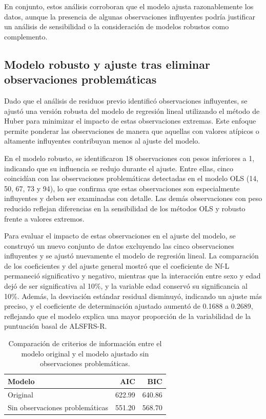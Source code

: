 \documentclass[12pt]{article} %
\begin{document}
En conjunto, estos análisis corroboran que el modelo ajusta razonablemente los datos, aunque la presencia de algunas observaciones influyentes podría justificar un análisis de sensibilidad o la consideración de modelos robustos como complemento.


\subsection{Modelo robusto y ajuste tras eliminar observaciones problemáticas}

Dado que el análisis de residuos previo identificó observaciones influyentes, se ajustó una versión robusta del modelo de regresión lineal utilizando el método de Huber para minimizar el impacto de estas observaciones extremas. Este enfoque permite ponderar las observaciones de manera que aquellas con valores atípicos o altamente influyentes contribuyan menos al ajuste del modelo.

En el modelo robusto, se identificaron 18 observaciones con pesos inferiores a 1, indicando que su influencia se redujo durante el ajuste. Entre ellas, cinco coincidían con las observaciones problemáticas detectadas en el modelo OLS (14, 50, 67, 73 y 94), lo que confirma que estas observaciones son especialmente influyentes y deben ser examinadas con detalle. Las demás observaciones con peso reducido reflejan diferencias en la sensibilidad de los métodos OLS y robusto frente a valores extremos.

Para evaluar el impacto de estas observaciones en el ajuste del modelo, se construyó un nuevo conjunto de datos excluyendo las cinco observaciones influyentes y se ajustó nuevamente el modelo de regresión lineal. La comparación de los coeficientes y del ajuste general mostró que el coeficiente de Nf-L permaneció significativo y negativo, mientras que la interacción entre sexo y edad dejó de ser significativa al 10\%, y la variable edad conservó su significancia al 10\%. Además, la desviación estándar residual disminuyó, indicando un ajuste más preciso, y el coeficiente de determinación ajustado aumentó de 0.1688 a 0.2689, reflejando que el modelo explica una mayor proporción de la variabilidad de la puntuación basal de ALSFRS-R.

\begin{table}[h!]
\centering
\caption{Comparación de criterios de información entre el modelo original y el modelo ajustado sin observaciones problemáticas.}
\label{tab:aic_bic_comparison}
\begin{tabular}{lrr}
\hline
\textbf{Modelo} & \textbf{AIC} & \textbf{BIC} \\
\hline
Original & 622.99 & 640.86 \\
Sin observaciones problemáticas & 551.20 & 568.70 \\
\hline
\end{tabular}
\end{table}
\end{document}
